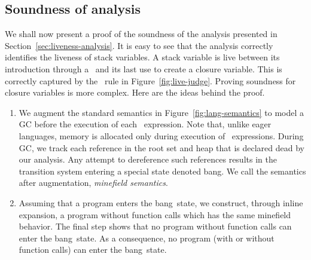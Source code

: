 \documentclass[9pt,nonatbib]{sigplanconf}
\newcommand{\added}[1]{#1}
\newcommand{\bang}{\mbox{\sc bang}}
\begin{document}
\subsection{Soundness of analysis}  

We shall now present a proof of the soundness of the analysis presented in
Section~\ref{sec:liveness-analysis}. It is easy to see that the analysis
correctly identifies the liveness of stack variables. A stack variable
is live
between its introduction through a \LET\  and its last use to
create a closure variable. This is correctly captured by the
\LET\ rule in Figure~\ref{fig:live-judge}.
Proving soundness  for closure  variables is more complex. Here  are the
ideas behind the proof. 
\begin{enumerate}
\item      We     augment      the      standard     semantics      in
  Figure~\ref{fig:lang-semantics} to  model a GC before  the execution
  of  each \LET\  expression. Note  that, unlike  eager
    languages,   memory  is   allocated  only   during  execution   of
    \LET\ expressions. During GC, we track each reference in the root
  set and heap that is declared  dead by our analysis.  Any attempt to
  dereference  such  references  results   in  the  transition  system
  entering a special state denoted \bang.  We call the semantics after
  augmentation, \emph{minefield semantics}.

\item \label{inline1} Assuming that a program enters the \bang\ state,
  we  construct,  through  inline expansion,  a  program
  without function  calls which has  the same minefield  behavior. The
  final step shows that no program  without function calls can enter the
  \bang\ state. As a consequence,  no program (with or without function
  calls) can enter the \bang\ state.
\end{enumerate}
\end{document}
